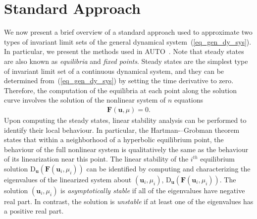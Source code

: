 \section{Standard Approach}{\label{sc_st_ap}}
We now present a brief overview of a standard approach used to approximate two types of invariant limit sets of the general dynamical system~(\ref{eq_gen_dy_sys}). In particular, we present the methods used in AUTO~\cite{Doedel_auto2000}. Note that steady states are also known as \emph{equilibria} and  \emph{fixed points}. Steady states are the simplest type of invariant limit set of a continuous dynamical system, and they can be determined from~(\ref{eq_gen_dy_sys}) by setting the time derivative to zero. Therefore, the computation of the equilibria at each point along the solution curve involves the solution of the nonlinear system of $n$ equations
\begin{align}
\mathbf{F}(\mathbf{u},\mu) = 0.
\end{align}
Upon computing the steady states, linear stability analysis can be performed to identify their local behaviour. In particular, the Hartman-–Grobman theorem states that within a neighborhood of a hyperbolic equilibrium point, the behaviour of the full nonlinear system is qualitatively the same as the behaviour of its linearization near this point. The linear stability of the $i^{th}$ equilibrium solution $\mathrm{D}_\mathbf{u}\left(\mathbf{F}(\mathbf{u}_i,\mu_i)\right)$ can be identified by computing and characterizing the eigenvalues of the linearized system about $(\mathbf{u}_i,\mu_i)$, $\mathrm{D}_\mathbf{u}\left(\mathbf{F}(\mathbf{u}_i,\mu_i)\right)$.  The solution $(\mathbf{u}_i,\mu_i)$ is \emph{asymptotically stable} if all of the eigenvalues have negative real part. In contrast, the solution is \emph{unstable} if at least one of the eigenvalues has a positive real part.

